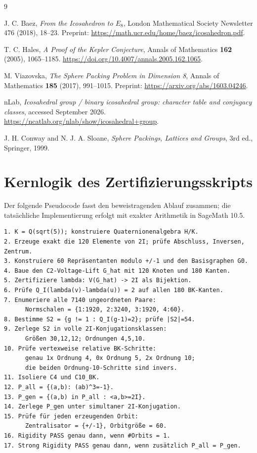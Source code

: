 \documentclass[11pt,a4paper]{article}
\theoremstyle{definition}
\begin{document}
\begin{thebibliography}{9}

J. C. Baez,
\emph{From the Icosahedron to \(E_8\)},
London Mathematical Society Newsletter 476 (2018), 18--23.
Preprint: \url{https://math.ucr.edu/home/baez/icosahedron.pdf}.

T. C. Hales,
\emph{A Proof of the Kepler Conjecture},
Annals of Mathematics \textbf{162} (2005), 1065--1185.
\url{https://doi.org/10.4007/annals.2005.162.1065}.

M. Viazovska,
\emph{The Sphere Packing Problem in Dimension 8},
Annals of Mathematics \textbf{185} (2017), 991--1015.
Preprint: \url{https://arxiv.org/abs/1603.04246}.

nLab,
\emph{Icosahedral group / binary icosahedral group: character table and conjugacy classes},
accessed September 2026.
\url{https://ncatlab.org/nlab/show/icosahedral+group}.

J. H. Conway and N. J. A. Sloane,
\emph{Sphere Packings, Lattices and Groups},
3rd ed., Springer, 1999.

\end{thebibliography}

\appendix
\section{Kernlogik des Zertifizierungsskripts}

Der folgende Pseudocode fasst den beweistragenden Ablauf zusammen; die tatsächliche Implementierung erfolgt mit exakter Arithmetik in SageMath 10.5.

\begin{verbatim}
1. K = Q(sqrt(5)); konstruiere Quaternionenalgebra H/K.
2. Erzeuge exakt die 120 Elemente von 2I; prüfe Abschluss, Inversen, Zentrum.
3. Konstruiere 60 Repräsentanten modulo +/-1 und den Basisgraphen G0.
4. Baue den C2-Voltage-Lift G_hat mit 120 Knoten und 180 Kanten.
5. Zertifiziere lambda: V(G_hat) -> 2I als Bijektion.
6. Prüfe Q_I(lambda(v)-lambda(u)) = 2 auf allen 180 BK-Kanten.
7. Enumeriere alle 7140 ungeordneten Paare:
      Normschalen = {1:1920, 2:3240, 3:1920, 4:60}.
8. Bestimme S2 = {g != 1 : Q_I(g-1)=2}; prüfe |S2|=54.
9. Zerlege S2 in volle 2I-Konjugationsklassen:
      Größen 30,12,12; Ordnungen 4,5,10.
10. Prüfe vertexweise relative BK-Schritte:
      genau 1x Ordnung 4, 0x Ordnung 5, 2x Ordnung 10;
      die beiden Ordnung-10-Schritte sind invers.
11. Isoliere C4 und C10_BK.
12. P_all = {(a,b): (ab)^3=-1}.
13. P_gen = {(a,b) in P_all : <a,b>=2I}.
14. Zerlege P_gen unter simultaner 2I-Konjugation.
15. Prüfe für jeden erzeugenden Orbit:
      Zentralisator = {+/-1}, Orbitgröße = 60.
16. Rigidity PASS genau dann, wenn #Orbits = 1.
17. Strong Rigidity PASS genau dann, wenn zusätzlich P_all = P_gen.
\end{verbatim}
\end{document}
